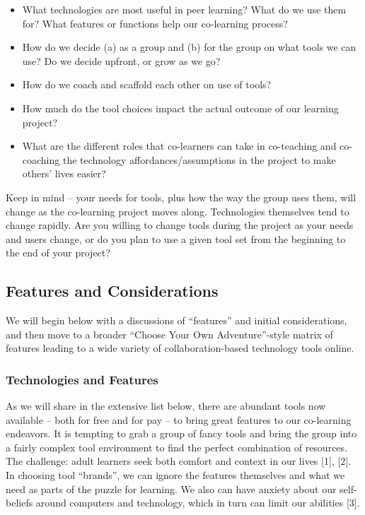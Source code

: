 \begin{itemize}
\item
  What technologies are most useful in peer learning? What do we use
  them for? What features or functions help our co-learning process?
\end{itemize}
\begin{itemize}
\item
  How do we decide (a) as a group and (b) for the group on what tools we
  can use? Do we decide upfront, or grow as we go?
\end{itemize}
\begin{itemize}
\item
  How do we coach and scaffold each other on use of tools?
\end{itemize}
\begin{itemize}
\item
  How much do the tool choices impact the actual outcome of our learning
  project?
\end{itemize}
\begin{itemize}
\item
  What are the different roles that co-learners can take in co-teaching
  and co-coaching the technology affordances/assumptions in the project
  to make others' lives easier?
\end{itemize}
Keep in mind -- your needs for tools, plus how the way the group uses
them, will change as the co-learning project moves along. Technologies
themselves tend to change rapidly. Are you willing to change tools
during the project as your needs and users change, or do you plan to use
a given tool set from the beginning to the end of your project?

\subsection{Features and Considerations}

We will begin below with a discussions of ``features'' and initial
considerations, and then move to a broader ``Choose Your Own
Adventure''-style matrix of features leading to a wide variety of
collaboration-based technology tools online.

\subsubsection{Technologies and Features}

As we will share in the extensive list below, there are abundant tools
now available -- both for free and for pay -- to bring great features to
our co-learning endeavors. It is tempting to grab a group of fancy tools
and bring the group into a fairly complex tool environment to find the
perfect combination of resources. The challenge: adult learners seek
both comfort and context in our lives {[}1{]}, {[}2{]}. In choosing tool
``brands'', we can ignore the features themselves and what we need as
parts of the puzzle for learning. We also can have anxiety about our
self-beliefs around computers and technology, which in turn can limit
our abilities {[}3{]}.

